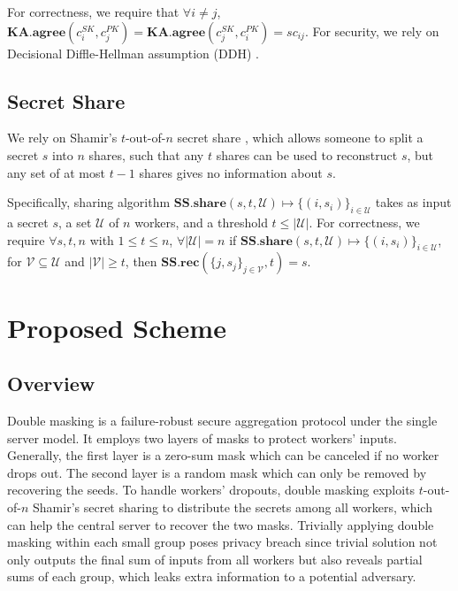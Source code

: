\documentclass[conference,a4paper]{IEEEtran}
\def\textbi#1{\textbf{\em #1}}
\begin{document}
    For correctness, we require that $\forall i\ne j$, $\mathbf{KA.agree}(c_i^{SK},c_j^{PK})=\mathbf{KA.agree}(c_j^{SK},c_i^{PK})=sc_{ij}$. For security, we rely on Decisional Diffle-Hellman assumption (DDH) \cite{DDH}.

    \subsection{Secret Share}
    We rely on Shamir's $t$-out-of-$n$ secret share \cite{shamir}, which allows someone to split a secret $s$ into $n$ shares, such that any $t$ shares can be used to reconstruct $s$, but any set of at most $t-1$ shares gives no information about $s$.

    Specifically, sharing algorithm $\mathbf{SS.share}(s,t,\mathcal{U})\mapsto \{(i,s_i)\}_{i\in\mathcal{U}}$ takes as input a secret $s$, a set $\mathcal{U}$ of $n$ workers, and a threshold $t\le |\mathcal{U}|$. For correctness, we require $\forall s,t,n$ with $1\le t\le n$, $\forall |\mathcal{U}|=n$ if $\mathbf{SS.share}(s,t,\mathcal{U})\mapsto \{(i,s_i)\}_{i\in\mathcal{U}}$, for $\mathcal{V}\subseteq \mathcal{U}$ and $|\mathcal{V}|\ge t$, then $\mathbf{SS.rec}(\{j,s_j\}_{j\in\mathcal{V}},t)=s$.

\section{Proposed Scheme}\label{scheme}
    \subsection{Overview}

    Double masking is a failure-robust secure aggregation protocol under the single server model. It employs two layers of masks to protect workers' inputs. Generally, the first layer is a zero-sum mask which can be canceled if no worker drops out. The second layer is a random mask which can only be removed by recovering the seeds. To handle workers' dropouts, double masking exploits $t$-out-of-$n$ Shamir's secret sharing to distribute the secrets among all workers, which can help the central server to recover the two masks. Trivially applying double masking within each small group poses privacy breach since trivial solution not only outputs the final sum of inputs from all workers but also reveals partial sums of each group, which leaks extra information to a potential adversary.
\end{document}
